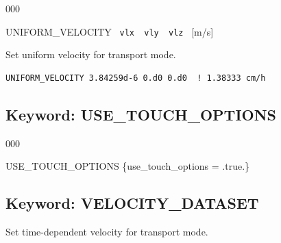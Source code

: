 \documentclass[12pt]{article}
\begin{document}

\begin{deflist}{000}
\item[UNIFORM\_VELOCITY] \ {\tt vlx \ vly \ vlz} \ [m/s]
\end{deflist}

 Set uniform velocity for transport mode.

\begin{mdframed}

\begin{verbatim}
UNIFORM_VELOCITY 3.84259d-6 0.d0 0.d0  ! 1.38333 cm/h
\end{verbatim}

\end{mdframed}

\hyperlink{target_key}{\return}


\newpage
\protect\hypertarget{target_touch}{}

\subsection{Keyword: USE\_TOUCH\_OPTIONS}


\begin{deflist}{000}
\item[USE\_TOUCH\_OPTIONS] \{use\_touch\_options = .true.\}
\end{deflist}



\hyperlink{target_key}{\return}


\newpage
\protect\hypertarget{target_veldata}{}

\subsection{Keyword: VELOCITY\_DATASET}

 Set time-dependent velocity for transport mode.
\end{document}
